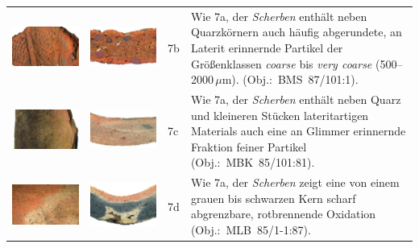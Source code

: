 \begin{footnotesize}
{\begin{longtable}{@{}m{}m{}m{}m{}@{}}
\includegraphics[width=.3\textwidth]{tbl/Tab_Fabrics/BMS87-101-1_5cm.jpg} & \includegraphics[width=.3\textwidth]{tbl/Tab_Fabrics/BMS87-101-1_2cm.jpg} & 7b & Wie 7a, der \textit{Scherben} enthält neben Quarzkörnern auch häufig abgerundete, an Laterit erinnernde Partikel der Größenklassen \textit{coarse} bis \textit{very coarse} (500--2000\,$\mu$m). (Obj.:~BMS~87/101:1). \\
\includegraphics[width=.3\textwidth]{tbl/Tab_Fabrics/MBK85-101-81_5cm.jpg} & \includegraphics[width=.3\textwidth]{tbl/Tab_Fabrics/MBK85-101-81_2cm.jpg} & 7c & Wie 7a, der \textit{Scherben} enthält neben Quarz und kleineren Stücken lateritartigen Materials auch eine an Glimmer erinnernde Fraktion feiner Partikel (Obj.:~MBK~85/101:81).\vspace{1em} \\
\includegraphics[width=.3\textwidth]{tbl/Tab_Fabrics/MLB85-1-1-87_5cm.jpg} & \includegraphics[width=.3\textwidth]{tbl/Tab_Fabrics/MLB85-1-1-87_2cm.jpg} & 7d & Wie 7a, der \textit{Scherben} zeigt eine von einem grauen bis schwarzen Kern scharf abgrenzbare, rotbrennende Oxidation (Obj.:~MLB~85/1-1:87).\vspace{1em} \\

\end{longtable}}
\end{footnotesize}
